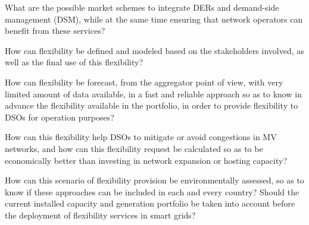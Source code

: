 \begin{tcolorbox}
\begin{RQ}
\item What are the possible market schemes to integrate DERs and demand-side management (DSM), while at the same time ensuring that network operators can benefit from these services?  
\item How can flexibility be defined and modeled based on the stakeholders involved, as well as the final use of this flexibility?
\item How can flexibility be forecast, from the aggregator point of view, with very limited amount of data available, in a fast and reliable approach so as to know in advance the flexibility available in the portfolio, in order to provide flexibility to DSOs for operation purposes?
\item How can this flexibility help DSOs to mitigate or avoid congestions in MV networks, and how can this flexibility request be calculated so as to be economically better than investing in network expansion or hosting capacity?
\item How can this scenario of flexibility provision be environmentally assessed, so as to know if these approaches can be included in each and every country? Should the current installed capacity and generation portfolio be taken into account before the deployment of flexibility services in smart grids?
\end{RQ}
\end{tcolorbox}
\vspace*{2mm}


